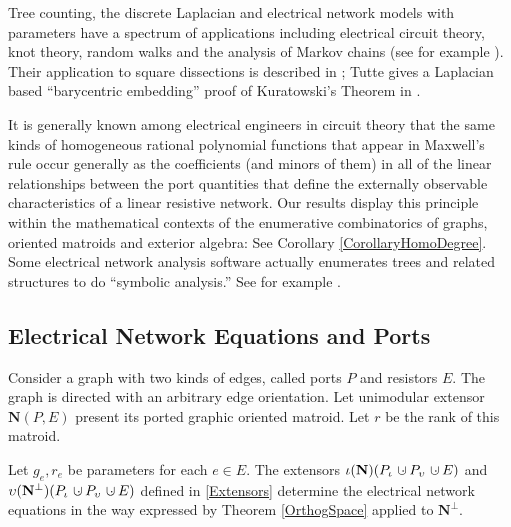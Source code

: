 \documentclass[12pt]{article}
\theoremstyle{definition}
\newcommand{\dunion}
{\mbox{\hbox{\hskip6pt$\cdot$\hskip-5.50pt$\cup$\hskip2pt}}}
\newcommand{\Is}{\ensuremath{\iota}}
\newcommand{\Vs}{\ensuremath{\upsilon}}
\newcommand{\ext}[1]{\ensuremath{\mathbf{#1}}}
\begin{document}
Tree counting, the discrete Laplacian and electrical network models
with parameters 
have a spectrum of applications including  electrical circuit theory,
knot theory, random walks and the analysis of Markov chains
(see for example
\cite{DoyleSnellRandom,BiggsAlgPotTheory,ChungYaoCovHeatKer,ChungYaoGreens}).
Their application to square dissections
is described in \cite{BSST,TutteBook}; Tutte gives a Laplacian based 
``barycentric embedding'' proof
of Kuratowski's Theorem in \cite{HowToDraw}.

It is generally known among electrical engineers in circuit theory
that the same kinds of homogeneous rational polynomial functions that appear
in Maxwell's rule occur generally as the coefficients (and 
minors of them) in all of the 
linear relationships between the port quantities that define the
externally observable characteristics of a linear resistive network.
Our results display this principle within the mathematical contexts of 
the enumerative combinatorics of graphs, oriented matroids and 
exterior algebra: See Corollary \ref{CorollaryHomoDegree}.
Some electrical network analysis software actually enumerates trees and related
structures to do ``symbolic analysis.''
See for example 
\cite{TraWilBilinear,ThulasiramanSwamyBook,someEEBooks,sdcISCAS98}.  

\subsection{Electrical Network Equations and Ports}
\label{ElecNetEquatSec}
Consider a graph with two kinds of edges, called ports $P$ and
resistors $E$.  The graph is directed with an arbitrary edge 
orientation.  Let unimodular extensor $\ext{N}(P,E)$ present
its ported graphic oriented matroid.  Let $r$ be the rank of
this matroid.

Let $g_e,r_e$ be parameters for each $e\in E$.  The extensors
$\Is(\ext{N})(P_\Is\dunion P_\Vs\dunion E)$
and 
$\Vs(\ext{N}^\perp)(P_\Is\dunion P_\Vs\dunion E)$ defined in \textsection
\ref{Extensors} determine the electrical network equations in the
way expressed by Theorem \ref{OrthogSpace} applied to $\ext{N}^\perp$.
\end{document}
